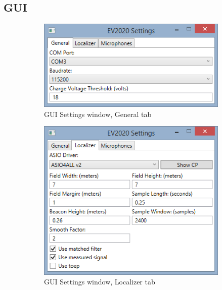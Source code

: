 \documentclass[final]{scrreprt} %
\begin{document}
\begin{appendices}
\chapter{GUI}
\label{app:gui}
\begin{figure}[h]
\centering
\begin{subfigure}[b]{0.5\linewidth}
	\includegraphics[width=\linewidth]{resources/UI-Settings-General.png}
	\caption{GUI Settings window, General tab}
	\label{fig:UI-Settings-General}
\end{subfigure}
\begin{subfigure}[b]{0.5\linewidth}
	\includegraphics[width=\linewidth]{resources/UI-Settings-Localizer.png}
	\caption{GUI Settings window, Localizer tab}
	\label{fig:UI-Settings-Localizer}
\end{subfigure}
\begin{subfigure}{0.5\linewidth}

\end{subfigure}
\end{figure}
\end{appendices}
\end{document}
